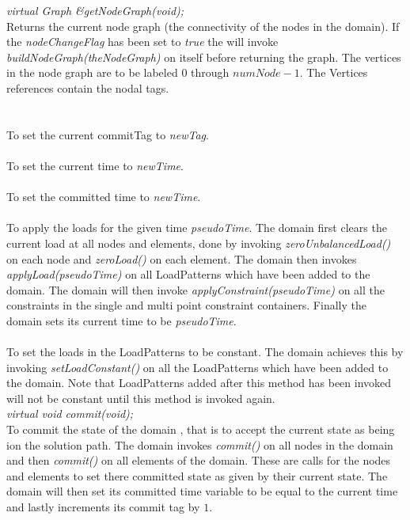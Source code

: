 {\em virtual Graph \&getNodeGraph(void);} \\
Returns the current node graph (the connectivity of the nodes in
the domain). If the {\em nodeChangeFlag} has been set to {\em true} the
will invoke {\em buildNodeGraph(theNodeGraph)} on itself before
returning the graph. The vertices in the node graph are to be labeled
$0$ through $numNode-1$. The Vertices references contain the nodal tags. \\ 


  \\
 \\
To set the current commitTag to {\em newTag}. \\

 \\
To set the current time to {\em newTime}. \\

 \\
To set the committed time to {\em newTime}. \\

 \\ 
To apply the loads for the given time {\em pseudoTime}. The domain
first clears the current load at all nodes and elements, done by
invoking {\em zeroUnbalancedLoad()} on each node and {\em zeroLoad()}
on each element. The domain then invokes {\em applyLoad(pseudoTime)}
on all LoadPatterns which have been added to the domain. The domain
will then invoke {\em applyConstraint(pseudoTime)} on all the
constraints in the single and multi point constraint
containers. Finally the domain sets its current time to be {\em
pseudoTime}.\\  

 \\
To set the loads in the LoadPatterns to be constant. The domain
achieves this by invoking {\em setLoadConstant()} on all the
LoadPatterns which have been added to the domain. Note that
LoadPatterns added after this method has been invoked will not be
constant until this method is invoked again. \\


{\em virtual void commit(void);} \\
To commit the state of the domain , that is to accept the current
state as being ion the solution path. The domain invokes {\em
commit()} on all nodes in the domain and then {\em 
commit()} on all elements of the domain. These are calls for the nodes
and elements to set there committed state as given by their current
state. The domain will then set its committed time variable to be
equal to the current time and lastly increments its commit tag by $1$. \\ 


